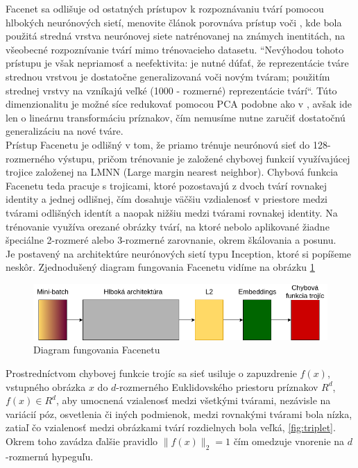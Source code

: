 \indent Facenet sa odlišuje od ostatných prístupov k rozpoznávaniu tvárí pomocou hlbokých neurónových sietí, menovite článok \cite{schroff2015facenet} porovnáva prístup voči \cite{wst2008deeply}, kde bola použitá stredná vrstva neurónovej siete natrénovanej na známych inentitách, na všeobecné rozpoznívanie tvárí mimo trénovacieho datasetu.
``Nevýhodou tohoto prístupu je však nepriamosť a neefektivita: je nutné dúfať, že reprezentácie tváre strednou vrstvou je dostatočne generalizovaná voči novým tváram; použitím strednej vrstvy na vzníkajú veľké (1000 - rozmerné) reprezentácie tvárí``\cite{schroff2015facenet}. 
Túto dimenzionalitu je možné síce redukovať pomocou PCA podobne ako v \cite{wst2008deeply}, avšak ide len o lineárnu transformáciu príznakov, čím nemusíme nutne zaručiť dostatočnú generalizáciu na nové tváre. \\

\indent Prístup Facenetu je odlišný v tom, že priamo trénuje neurónovú sieť do 128-rozmerného výstupu, pričom trénovanie je založené chybovej funkcií využívajúcej trojice založenej na LMNN (Large margin nearest neighbor)\cite{weinberger2009distance}.
Chybová funkcia Facenetu teda pracuje s trojicami, ktoré pozostavajú z dvoch tvárí rovnakej identity a jednej odlišnej, čím dosahuje väčšiu vzdialenosť v priestore medzi tvárami odlišných identít a naopak nižšiu medzi tvárami rovnakej identity.
Na trénovanie využíva orezané obrázky tvárí, na ktoré nebolo aplikované žiadne špeciálne 2-rozmeré alebo 3-rozmerné zarovnanie, okrem škálovania a posunu. \\

\indent Je postavený na architektúre neurónových sietí typu Inception, ktoré si popíšeme neskôr.
Zjednodušený diagram fungovania Facenetu vidíme na obrázku \ref{fig:facenet}

\begin{figure}[H]
	\centering
	\includegraphics[width=1\linewidth]{img/facenet}
	\caption{Diagram fungovania Facenetu}
	\label{fig:facenet}
\end{figure}

\indent Prostredníctvom chybovej funkcie trojíc sa sieť usiluje o zapuzdrenie $f(x)$, vstupného obrázka $x$ do $d$-rozmerného Euklidovského priestoru príznakov $R^d$, $f(x) \in R^d$, aby umocnená vzialenosť medzi všetkými tvárami, nezávisle na variácií póz, osvetlenia či iných podmienok, medzi rovnakými tvárami bola nízka, zatiaľ čo vzialenosť medzi obrázkami tvárí rozdielnych bola veľká, \ref{fig:triplet}\cite{schroff2015facenet}.
Okrem toho zavádza ďalšie pravidlo $\parallel f(x) \parallel_{2} = 1$ čím omedzuje vnorenie na 
$d$-rozmernú hypeguľu.


